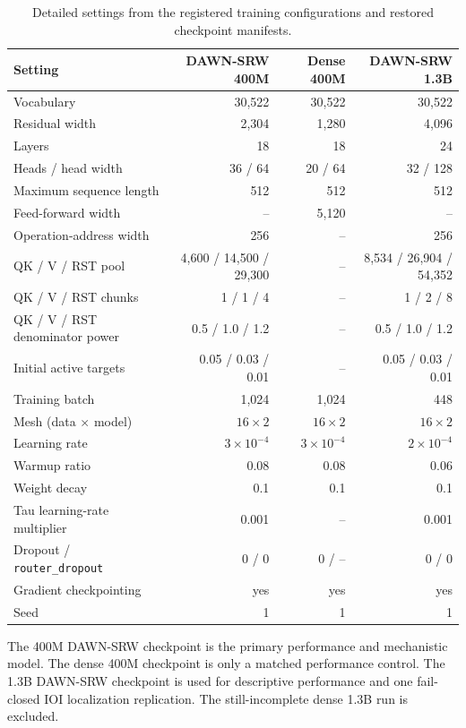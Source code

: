 \documentclass{article}
\newcommand{\DAWN}{DAWN-SRW}
\begin{document}
\begin{table}[!t]
\centering
\caption{Detailed settings from the registered training configurations and
restored checkpoint manifests.}
\scriptsize
\renewcommand{\arraystretch}{0.94}
\begin{tabular}{lrrr}
\toprule
Setting & \DAWN{} 400M & Dense 400M & \DAWN{} 1.3B\\
\midrule
Vocabulary & 30,522 & 30,522 & 30,522\\
Residual width & 2,304 & 1,280 & 4,096\\
Layers & 18 & 18 & 24\\
Heads / head width & 36 / 64 & 20 / 64 & 32 / 128\\
Maximum sequence length & 512 & 512 & 512\\
Feed-forward width & -- & 5,120 & --\\
Operation-address width & 256 & -- & 256\\
QK / V / RST pool & 4,600 / 14,500 / 29,300 & -- &
8,534 / 26,904 / 54,352\\
QK / V / RST chunks & 1 / 1 / 4 & -- & 1 / 2 / 8\\
QK / V / RST denominator power & 0.5 / 1.0 / 1.2 & -- &
0.5 / 1.0 / 1.2\\
Initial active targets & 0.05 / 0.03 / 0.01 & -- &
0.05 / 0.03 / 0.01\\
Training batch & 1,024 & 1,024 & 448\\
Mesh (data \(\times\) model) & \(16\times2\) & \(16\times2\) & \(16\times2\)\\
Learning rate & \(3\times10^{-4}\) & \(3\times10^{-4}\) & \(2\times10^{-4}\)\\
Warmup ratio & 0.08 & 0.08 & 0.06\\
Weight decay & 0.1 & 0.1 & 0.1\\
Tau learning-rate multiplier & 0.001 & -- & 0.001\\
Dropout / \texttt{router\_dropout} & 0 / 0 & 0 / -- & 0 / 0\\
Gradient checkpointing & yes & yes & yes\\
Seed & 1 & 1 & 1\\
\bottomrule
\end{tabular}
\end{table}

The 400M \DAWN{} checkpoint is the primary performance and mechanistic model.
The dense 400M checkpoint is only a matched performance control. The 1.3B
\DAWN{} checkpoint is used for descriptive performance and one fail-closed IOI
localization replication. The still-incomplete dense 1.3B run is excluded.
\end{document}
